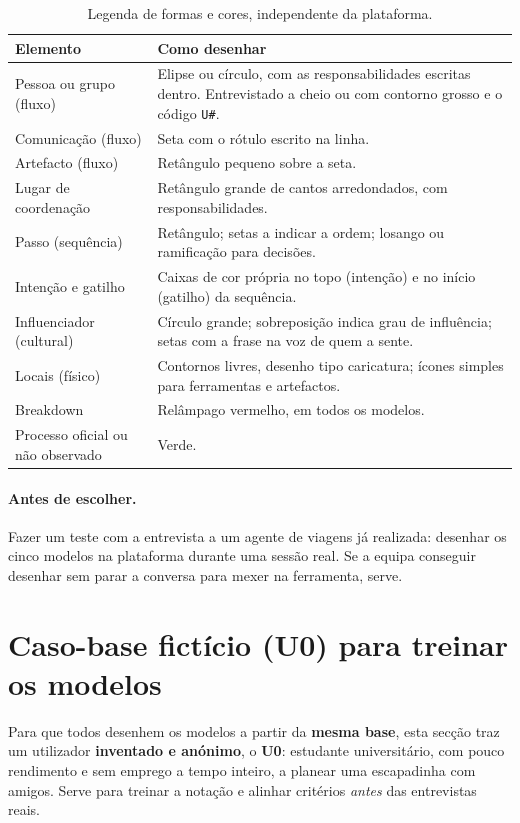 \documentclass[11pt,a4paper]{article}
\begin{document}
\begin{table}[h]
\centering\small
\begin{tabularx}{\textwidth}{@{}p{3.6cm}L@{}}
\toprule
\textbf{Elemento} & \textbf{Como desenhar} \\
\midrule
Pessoa ou grupo (fluxo) & Elipse ou círculo, com as responsabilidades escritas dentro. Entrevistado a cheio ou com contorno grosso e o código \texttt{U\#}. \\
Comunicação (fluxo) & Seta com o rótulo escrito na linha. \\
Artefacto (fluxo) & Retângulo pequeno sobre a seta. \\
Lugar de coordenação & Retângulo grande de cantos arredondados, com responsabilidades. \\
Passo (sequência) & Retângulo; setas a indicar a ordem; losango ou ramificação para decisões. \\
Intenção e gatilho & Caixas de cor própria no topo (intenção) e no início (gatilho) da sequência. \\
Influenciador (cultural) & Círculo grande; sobreposição indica grau de influência; setas com a frase na voz de quem a sente. \\
Locais (físico) & Contornos livres, desenho tipo caricatura; ícones simples para ferramentas e artefactos. \\
Breakdown & Relâmpago vermelho, em todos os modelos. \\
Processo oficial ou não observado & Verde. \\
\bottomrule
\end{tabularx}
\caption{Legenda de formas e cores, independente da plataforma.}
\end{table}

\paragraph{Antes de escolher.} Fazer um teste com a entrevista a um agente de viagens já realizada: desenhar os cinco modelos na plataforma durante uma sessão real. Se a equipa conseguir desenhar sem parar a conversa para mexer na ferramenta, serve.

\section{Caso-base fictício (U0) para treinar os modelos}
\label{sec:u0}

Para que todos desenhem os modelos a partir da \textbf{mesma base}, esta secção traz um utilizador \textbf{inventado e anónimo}, o \textbf{U0}: estudante universitário, com pouco rendimento e sem emprego a tempo inteiro, a planear uma escapadinha com amigos. Serve para treinar a notação e alinhar critérios \emph{antes} das entrevistas reais.
\end{document}

